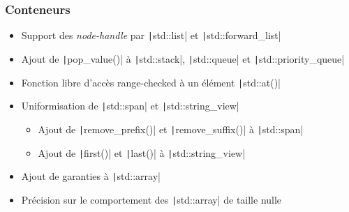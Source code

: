 \documentclass[C++.tex]{subfiles}
\begin{document}
\begin{frame}[fragile]
	\frametitle{Conteneurs}
	\begin{itemize}
		\item Support des \textit{node-handle} par \texttt|std::list| et \texttt|std::forward_list|
		\item Ajout de \texttt|pop_value()| à \texttt|std::stack|, \texttt|std::queue| et \texttt|std::priority_queue|
		\item Fonction libre d'accès \og{}range-checked\fg{} à un élément \texttt|std::at()|
		\item Uniformisation de \texttt|std::span| et \texttt|std::string_view|
		\begin{itemize}
			\item Ajout de \texttt|remove_prefix()| et \texttt|remove_suffix()| à \texttt|std::span|
			\item Ajout de \texttt|first()| et \texttt|last()| à \texttt|std::string_view|
		\end{itemize}
		\item Ajout de garanties à \texttt|std::array|
		\item Précision sur le comportement des \texttt|std::array| de taille nulle
	\end{itemize}

\end{frame}
\end{document}
